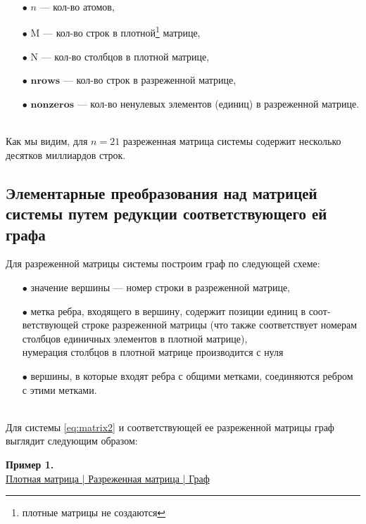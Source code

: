 \begin{itemize}
	\item[$\bullet$]{$n$  --- кол-во атомов},
	\item[$\bullet$]{$\mathrm{M}$ --- кол-во строк в плотной\footnote[1]{плотные матрицы не создаются} матрице,}
	\item[$\bullet$]{$\mathrm{N}$ --- кол-во столбцов в плотной матрице,}
	\item[$\bullet$]{$\mathbf{nrows}$  --- кол-во строк в разреженной матрице,}
	\item[$\bullet$]{$\mathbf{nonzeros}$ --- кол-во ненулевых элементов (единиц) в разреженной матрице.}
\end{itemize}
\
\\[0pt]
\noindent Как мы видим, для $n = 21$ разреженная матрица системы содержит несколько десятков миллиардов строк.

\subsection{Элементарные преобразования над матрицей системы путем редукции соответствующего ей графа}\label{subsec:ch4/subsect2}

Для разреженной матрицы системы построим граф по следующей схеме:
\begin{itemize}
	\item[$\bullet$]{значение вершины --- номер строки в разреженной матрице,}
	\item[$\bullet$]{метка ребра, входящего в вершину, содержит позиции единиц в соот­ветствующей строке разреженной матрицы (что также соответствует номерам столбцов единичных элементов в плотной матрице),\\[12pt]
	нумерация столбцов в плотной матрице производится с нуля
	}
	\item[$\bullet$]{вершины, в которые входят ребра с общими метками, соединяются реб­ром с этими метками.}
\end{itemize}
\
\\[0pt]
\indent Для системы \eqref{eq:matrix2} и соответствующей ее разреженной матрицы граф выглядит следующим образом:

\clearpage
\textbf{Пример 1.}
\\[12pt]
\underline{\hspace{2em} Плотная матрица \hspace{2em} | \hspace{1em} Разреженная матрица \hspace{2em} | \hspace{3em} Граф \hspace{3em}}\\

